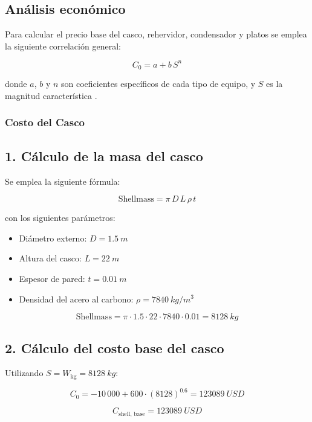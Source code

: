 \subsection{Análisis económico}

Para calcular el precio base del casco, rehervidor, condensador y platos se emplea la siguiente correlación general:

\[
    C_0 = a + b \, S^n
\]

donde \(a\), \(b\) y \(n\) son coeficientes específicos de cada tipo de equipo, y \(S\) es la magnitud característica \parencite[p.~319]{towler2013chemical}.

\bigskip

\subsubsection{Costo del Casco}

\subsection*{1. Cálculo de la masa del casco}

Se emplea la siguiente fórmula:

\[
    \text{Shellmass} = \pi \, D \, L \, \rho \, t
\]

con los siguientes parámetros:

\begin{itemize}
    \item Diámetro externo: \(D = \SI{1.5}{m}\)
    \item Altura del casco: \(L = \SI{22}{m}\)
    \item Espesor de pared: \(t = \SI{0.01}{m}\)
    \item Densidad del acero al carbono: \(\rho = \SI{7840}{kg/m^3}\)
\end{itemize}

\[
    \text{Shellmass} = \pi \cdot 1.5 \cdot 22 \cdot 7840 \cdot 0.01 = \SI{8128}{kg}
\]

\subsection*{2. Cálculo del costo base del casco}

Utilizando \(S = W_{\text{kg}} = \SI{8128}{kg}\):

\[
    C_0 = -10\,000 + 600 \cdot (8128)^{0.6} = \SI{123089}{USD}
\]

\[
    \boxed{C_{\text{shell, base}} = \SI{123089}{USD}}
\]

